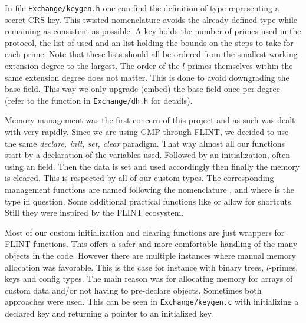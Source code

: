 \documentclass[../main.tex]{subfilesubs}
\begin{document}
In file \texttt{Exchange/keygen.h} one can find the definition of type  representing a secret CRS key.
This twisted nomenclature avoids the already defined  type while remaining as consistent as possible.
A key holds the number of primes used in the protocol, the list of  used and an  list holding the bounds on the steps to take for each prime.
Note that these lists should all be ordered from the smallest working extension degree to the largest.
The order of the $l$-primes themselves within the same extension degree does not matter.
This is done to avoid downgrading the base field.
This way we only upgrade (embed) the base field once per degree (refer to the  function  in \texttt{Exchange/dh.h} for details).

Memory management was the first concern of this project and as such was dealt with very rapidly.
Since we are using GMP through FLINT, we decided to use the same \textit{declare, init, set, clear} paradigm.
That way almost all our functions start by a declaration of the variables used.
Followed by an initialization, often using an  field.
Then the data is set and used accordingly then finally the memory is cleared.
This is respected by all of our custom types.
The corresponding management functions are named following the nomenclature ,  and  where \tF{*} is the type in question.
Some additional practical functions like  or  allow for shortcuts.
Still they were inspired by the FLINT ecosystem.

Most of our custom initialization and clearing functions are just wrappers for FLINT functions.
This offers a safer and more comfortable handling of the many objects in the code.
However there are multiple instances where manual memory allocation was favorable.
This is the case for instance with binary trees, $l$-primes, keys and config types.
The main reason was for allocating memory for arrays of custom data and/or not having to pre-declare objects.
Sometimes both approaches were used.
This can be seen in \texttt{Exchange/keygen.c} with  initializing a declared key and  returning a pointer to an initialized key.
\end{document}

